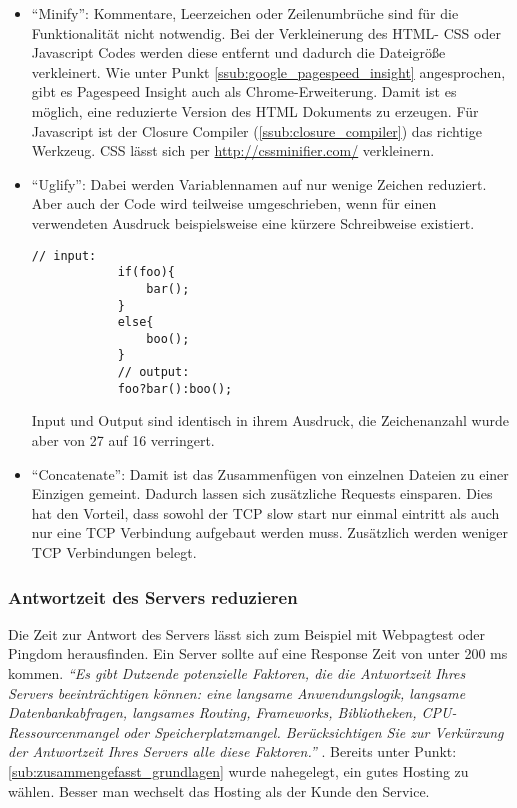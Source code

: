 				\begin{itemize}
					\item "`Minify"': Kommentare, Leerzeichen oder Zeilenumbrüche sind für die Funktionalität nicht notwendig. Bei der Verkleinerung des HTML- CSS oder Javascript Codes werden diese entfernt und dadurch die Dateigröße verkleinert. Wie unter Punkt \ref{ssub:google_pagespeed_insight} angesprochen, gibt es Pagespeed Insight auch als Chrome-Erweiterung. Damit ist es möglich, eine reduzierte Version des HTML Dokuments zu erzeugen. Für Javascript ist der Closure Compiler (\ref{ssub:closure_compiler}) das richtige Werkzeug. CSS lässt sich per \url{http://cssminifier.com/} verkleinern.
					\item "`Uglify"': Dabei werden Variablennamen auf nur wenige Zeichen reduziert. Aber auch der Code wird teilweise umgeschrieben, wenn für einen verwendeten Ausdruck beispielsweise eine kürzere Schreibweise existiert.

			\begin{lstlisting}[captionpos=b, caption=Beispiel: Uglify eines Ausdrucks, label=lst:uglify]
			// input:
			if(foo){
				bar();
			}
			else{
				boo();
			}
			// output:
			foo?bar():boo();
			\end{lstlisting}

					Input und Output sind identisch in ihrem Ausdruck, die Zeichenanzahl wurde aber von 27 auf 16 verringert.

					\item "`Concatenate"': Damit ist das Zusammenfügen von einzelnen Dateien zu einer Einzigen gemeint. Dadurch lassen sich zusätzliche Requests einsparen. Dies hat den Vorteil, dass sowohl der TCP slow start nur einmal eintritt als auch nur eine TCP Verbindung aufgebaut werden muss. Zusätzlich werden weniger TCP Verbindungen belegt.
				\end{itemize}


			\subsubsection{Antwortzeit des Servers reduzieren} %
			\label{ssub:antwortzeit_des_servers_reduzieren}
				Die Zeit zur Antwort des Servers lässt sich zum Beispiel mit Webpagtest oder Pingdom herausfinden. Ein Server sollte auf eine Response Zeit von unter 200 ms kommen. \textit{"`Es gibt Dutzende potenzielle Faktoren, die die Antwortzeit Ihres Servers beeinträchtigen können: eine langsame Anwendungslogik, langsame Datenbankabfragen, langsames Routing, Frameworks, Bibliotheken, CPU-Ressourcenmangel oder Speicherplatzmangel. Berücksichtigen Sie zur Verkürzung der Antwortzeit Ihres Servers alle diese Faktoren."'} \autocite{google15}. Bereits unter Punkt: \ref{sub:zusammengefasst_grundlagen} wurde nahegelegt, ein gutes Hosting zu wählen. Besser man wechselt das Hosting als der Kunde den Service.


